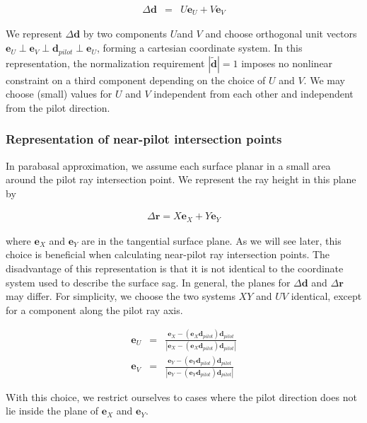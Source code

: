 \documentclass[12pt,a4paper,twoside,openright,BCOR10mm,headsepline,titlepage,abstracton,chapterprefix,final]{scrreprt}
\newcommand\Vector[1]{{\mathbf{#1}}}
\begin{document}
\begin{eqnarray}
 \Delta\Vector{d} &=& U \Vector{e}_{U} + V \Vector{e}_{V}
\end{eqnarray}

We represent $\Delta\Vector{d}$ by two components $U$and $V$ and choose orthogonal unit vectors $\Vector{e}_{U} \perp \Vector{e}_{V} \perp \Vector{d}_{pilot} \perp \Vector{e}_{U}$,
forming a cartesian coordinate system.
In this representation, the normalization requirement $|\tilde{\Vector{d}}| = 1$ imposes no nonlinear constraint on a third component depending on the choice of $U$ and $V$.
We may choose (small) values for $U$ and $V$ independent from each other and independent from the pilot direction. 

\subsubsection{Representation of near-pilot intersection points}

In parabasal approximation, we assume each surface planar in a small area around the pilot ray intersection point. 
We represent the ray height in this plane by

\begin{eqnarray}
 \Delta\Vector{r} = X \Vector{e}_{X} + Y \Vector{e}_{Y}
\end{eqnarray}

where $\Vector{e}_{X}$ and $\Vector{e}_{Y}$ are in the tangential surface plane.
As we will see later, this choice is beneficial when calculating near-pilot ray intersection points.
The disadvantage of this representation is that it is not identical to the coordinate system used to describe the surface sag.
In general, the planes for $\Delta\Vector{d}$ and $\Delta\Vector{r}$ may differ.
For simplicity, we choose the two systems $XY$ and $UV$ identical,
except for a component along the pilot ray axis.

\begin{eqnarray}
 \Vector{e}_{U} &=& \frac{\Vector{e}_{X} - (\Vector{e}_{X}\Vector{d}_{pilot})\Vector{d}_{pilot}}{|\Vector{e}_{X} - (\Vector{e}_{X}\Vector{d}_{pilot})\Vector{d}_{pilot}|}
 \\[2ex]
 \Vector{e}_{V} &=& \frac{\Vector{e}_{Y} - (\Vector{e}_{Y}\Vector{d}_{pilot})\Vector{d}_{pilot}}{|\Vector{e}_{Y} - (\Vector{e}_{Y}\Vector{d}_{pilot})\Vector{d}_{pilot}|}
\end{eqnarray}

With this choice, we restrict ourselves to cases where the pilot direction does not lie inside the plane of $\Vector{e}_{X}$ and $\Vector{e}_{Y}$.
\end{document}
